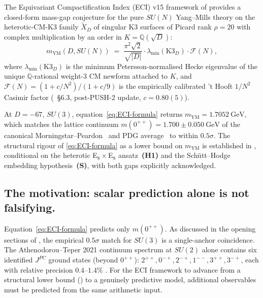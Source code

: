 \documentclass[11pt,a4paper]{amsart}
\providecommand{\Q}{\mathbb{Q}}
\theoremstyle{definition}
\begin{document}
The Equivariant Compactification Index (ECI) v15 framework of \cite{ThmC6FN} provides
a closed-form mass-gap conjecture for the pure $SU(N)$ Yang--Mills theory on the
heterotic-CM-$\mathrm{K3}$ family $\widetilde X_{D}$ of singular K3 surfaces of
Picard rank $\rho = 20$ with complex multiplication by an order in $K = \mathbb{Q}(\sqrt{D})$:
\begin{equation}\label{eq:ECI-formula}
m_{\mathrm{YM}}(D, SU(N)) \;=\; \frac{\pi^{2} \sqrt{2}}{\sqrt{|D|}} \cdot
\lambda_{\min}(\mathrm{K3}_{D}) \cdot \mathcal{F}(N),
\end{equation}
where $\lambda_{\min}(\mathrm{K3}_{D})$ is the minimum Petersson-normalised Hecke
eigenvalue of the unique $\Q$-rational weight-$3$ CM newform attached to $K$, and
$\mathcal{F}(N) = (1 + c/N^{2})/(1 + c/9)$ is the empirically calibrated 't Hooft
$1/N^{2}$ Casimir factor (\cite{ThmC6FN}~§6.3, post-PUSH-2 update, $c = 0.80(5)$).

At $D = -67$, $SU(3)$, equation~\eqref{eq:ECI-formula} returns
$m_{\mathrm{YM}} = 1.7052~\mathrm{GeV}$, which matches the lattice continuum
$m(0^{++}) = 1.700 \pm 0.050~\mathrm{GeV}$ of the canonical
Morningstar--Peardon~\cite{MorningstarPeardon1999} and PDG average~\cite{PDG2024} to
within $0.5\sigma$. The structural rigour of \eqref{eq:ECI-formula} as a lower bound
on $m_{\mathrm{YM}}$ is established in \cite[Theorem~C.6]{ThmC6FN}, conditional on the
heterotic E$_{8}\times$E$_{8}$ ansatz~\textbf{(H1)} and the Schütt--Hodge embedding
hypothesis~\textbf{(S)}, with both gaps explicitly acknowledged.

\subsection*{The motivation: scalar prediction alone is not falsifying.}
Equation~\eqref{eq:ECI-formula} predicts only $m(0^{++})$. As discussed in the
opening sections of \cite[\S6.4]{ThmC6FN}, the empirical $0.5\sigma$ match for
$SU(3)$ is a single-anchor coincidence. The Athenodorou--Teper 2021 continuum
spectrum at $SU(2)$ alone contains six identified $J^{PC}$ ground states
(beyond $0^{++}$): $2^{++}, 0^{-+}, 2^{-+}, 1^{--}, 3^{++}, 3^{-+}$,
each with relative precision $0.4$--$1.4\%$ \cite{AthenodorouTeper2021}.
For the ECI framework to advance from a structural lower bound (\cite[Theorem C.6]{ThmC6FN})
to a genuinely predictive model, additional observables must be predicted from
the same arithmetic input.
\end{document}
